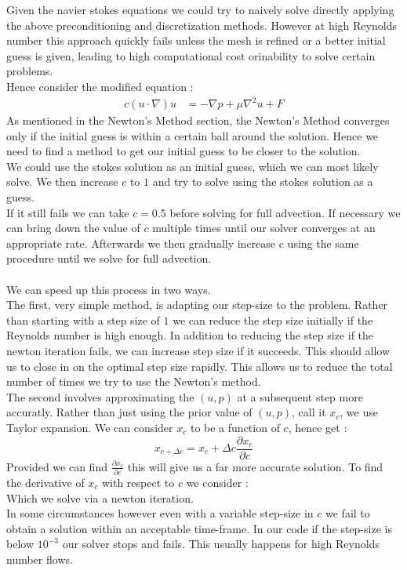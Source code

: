 \documentclass[11pt,twoside,a4paper]{article}
\begin{document}
Given the navier stokes equations we could try to naively solve directly applying the above preconditioning and discretization methods. However at high Reynolds number this approach quickly fails unless the mesh is refined or a better initial guess is given, leading to high computational cost orinability to solve certain problems.\\
Hence consider the modified equation :
\begin{align}
c (u \cdot \nabla) u &= -\nabla p + \mu \nabla^2 u + F
\end{align}
As mentioned in the Newton's Method section, the Newton's Method converges only if the initial guess is within a certain ball around the solution. Hence we need to find a method to get our initial guess to be closer to the solution.\\
We could use the stokes solution as an initial guess, which we can most likely solve. We then increase $c$ to $1$ and try to solve using the stokes solution as a guess. \\
If it still fails we can take $c =0.5$ before solving for full advection. If necessary we can bring down the value of $c$ multiple times until our solver converges at an appropriate rate. Afterwards we then gradually increase c using the same procedure until we solve for full advection.\\
\\
We can speed up this process in two ways.\\
The first, very simple method, is adapting our step-size to the problem. Rather than starting with a step size of $1$ we can reduce the step size initially if the Reynolds number is high enough. In addition to reducing the step size if the newton iteration fails, we can increase step size if it succeeds. This should allow us to close in on the optimal step size rapidly. This allows us to reduce the total number of times we try to use the Newton's method.\\
The second involves approximating the $(u,p)$ at a subsequent step more accuratly. Rather than just using the prior value of $(u,p)$, call it $x_c$, we use Taylor expansion. We can consider $x_c$ to be a function of $c$, hence get :
$$
x_{c+\Delta c} = x_c + \Delta c \frac{\partial x_c}{\partial c}
$$
Provided we can find $\frac{\partial x_c}{\partial c}$ this will give us a far more accurate solution.
To find the derivative of $x_c$ with respect to $c$ we consider :\\

Which we solve via a newton iteration.\\
In some circumstances however even with a variable step-size in $c$ we fail to obtain a solution within an acceptable time-frame. In our code if the step-size is below $10^{-3}$ our solver stops and fails. This usually happens for high Reynolds number flows.
\end{document}
